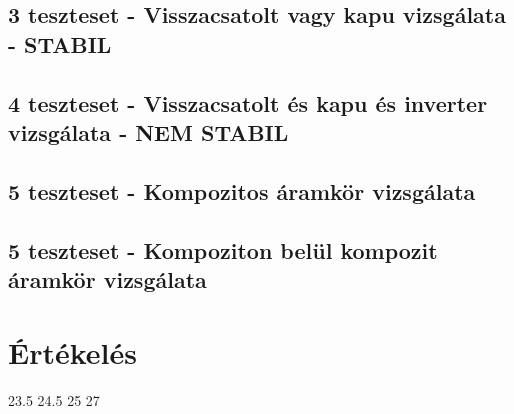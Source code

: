 
\subsection{3 teszteset - Visszacsatolt vagy kapu vizsgálata - STABIL}

\subsection{4 teszteset - Visszacsatolt és kapu és inverter vizsgálata -  NEM STABIL}

\subsection{5 teszteset - Kompozitos áramkör vizsgálata}

\subsection{5 teszteset - Kompoziton belül kompozit áramkör vizsgálata}












\section{Értékelés}

\begin{ertekeles}
{23.5}        %
{24.5}
{25}
{27}
\end{ertekeles}

